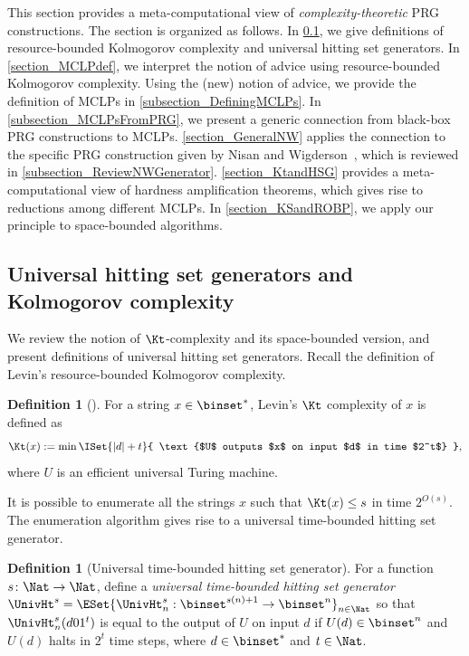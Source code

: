 \documentclass[11pt]{article}
\numberwithin{equation}{section}
\theoremstyle{definition}
\newtheorem{definition}[theorem]{Definition}
\theoremstyle{plain}
\begin{document}
%
This section provides a meta-computational view of
\emph{complexity-theoretic} PRG constructions.
The section is organized as follows.
In \cref{subsection_UniversalHSG},
we give definitions of resource-bounded Kolmogorov complexity and universal hitting set generators.
In \cref{section_MCLPdef},
we interpret the notion of advice
using resource-bounded Kolmogorov complexity.
Using the (new) notion of advice,
we provide the definition of MCLPs in \cref{subsection_DefiningMCLPs}.
In \cref{subsection_MCLPsFromPRG}, we present
a generic connection from black-box PRG constructions to MCLPs.
\cref{section_GeneralNW} applies the connection
to the specific PRG construction given by Nisan and Wigderson~\cite{NisanW94_jcss_journals},
which is reviewed in \cref{subsection_ReviewNWGenerator}.
\cref{section_KtandHSG} provides
a meta-computational view of hardness amplification theorems,
which gives rise to reductions among different MCLPs.
In \cref{section_KSandROBP},
we apply our principle to space-bounded algorithms.

%
%
%
%
%
%
%
%
%
%

\subsection{Universal hitting set generators and Kolmogorov complexity}
\label{subsection_UniversalHSG}


We review the notion of $\Kt$-complexity and its space-bounded version, and present
definitions of universal hitting set generators.
Recall the definition of Levin's resource-bounded Kolmogorov complexity.
\begin{definition}
  [\cite{Levin84_iandc_journals}]
  For a string $x \in \binset^*$, Levin's $\Kt$ complexity of $x$ is defined as
  $$
    \Kt(x) := \min \ISet { |d| + t } { \text{$U$ outputs $x$ on input $d$ in time $2^t$} },
  $$
  where $U$ is an efficient universal Turing machine.
\end{definition}

It is possible to enumerate all the strings $x$ such that $\Kt(x) \le s$
in time $2^{O(s)}$.
The enumeration algorithm gives rise to a universal time-bounded hitting set generator.
\begin{definition}
  [Universal time-bounded hitting set generator]
  For a function $s \colon \Nat \to \Nat$,
  define
  a \emph{universal time-bounded hitting set generator}
  $\UnivHt^s = \ESet{ \UnivHt^s_n : \binset^{s(n)+1} \to \binset^n }_{n \in \Nat}$ so that
  $\UnivHt^s_n(d 0 1^t)$ is equal to the output of $U$ on input $d$
  if $U(d) \in \binset^n$ and $U(d)$ halts in $2^t$ time steps,
  where $d \in \binset^*$ and $t \in \Nat$.
\end{definition}
\end{document}

